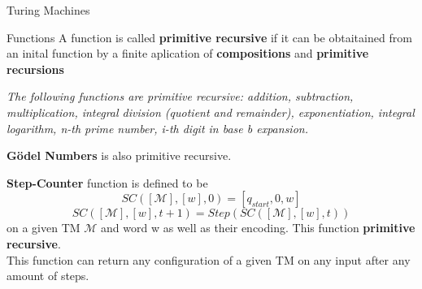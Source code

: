 \documentclass[12pt, letterpaper]{article}
\begin{document}
\begin{section}{Turing Machines}
\begin{subsection}{Functions}
    A function is called \textbf{primitive recursive} if it can be obtaitained
    from an inital function by a finite aplication of
    \textbf{compositions} and \textbf{primitive recursions}

    \textit{The following functions are primitive recursive:
      addition, subtraction, multiplication, integral division
      (quotient and remainder), exponentiation, integral logarithm,
      n-th prime number, i-th digit in base b expansion.}

    \textbf{Gödel Numbers} is also primitive recursive.

    \textbf{Step-Counter} function is defined to be
    \[SC([\mathscr{M}], [w], 0) = [q_{start}, 0, w]\]
    \[SC([\mathscr{M}], [w], t + 1) = Step(SC([\mathscr{M}], [w], t))\]
    on a given TM \(\mathscr{M}\) and word w as well as their encoding.
    This function \textbf{primitive recursive}. \\
    This function can return any configuration of a given TM on any input
    after any amount of steps.

  \end{subsection}

\end{section}
\end{document}
